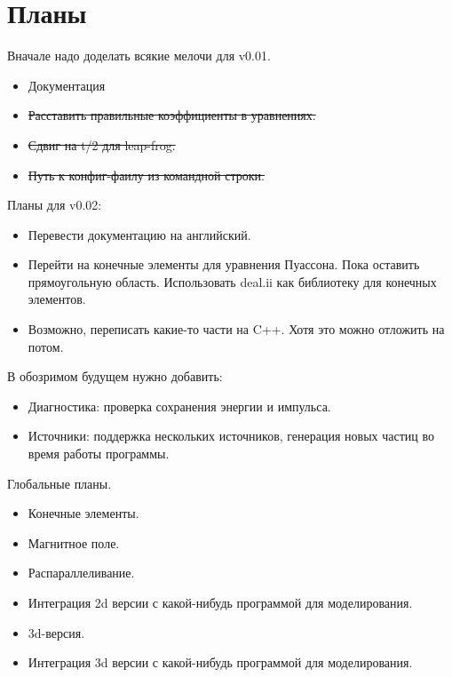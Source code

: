 \section{ Планы }
Вначале надо доделать всякие мелочи для v0.01.
\begin{itemize}
\item Документация
\item \sout{Расставить правильные коэффициенты в уравнениях.}
\item \sout{Сдвиг на t/2 для leap-frog.}
\item \sout{Путь к конфиг-фаилу из командной строки.}
\end{itemize}

Планы для v0.02:
\begin{itemize}
\item Перевести документацию на английский.
\item Перейти на конечные элементы для уравнения Пуассона.
  Пока оставить прямоугольную область. 
  Использовать deal.ii как библиотеку для конечных элементов.
\item Возможно, переписать какие-то части на C++. Хотя это можно отложить на потом.
\end{itemize}


В обозримом будущем нужно добавить:
\begin{itemize}
\item Диагностика: проверка сохранения энергии и импульса.
\item Источники: поддержка нескольких источников, генерация новых частиц во время работы программы.
\end{itemize}

Глобальные планы.
\begin{itemize}
\item Конечные элементы.
\item Магнитное поле.
\item Распараллеливание.
\item Интеграция 2d версии с какой-нибудь программой для моделирования.
\item 3d-версия.
\item Интеграция 3d версии с какой-нибудь программой для моделирования.
\end{itemize}


